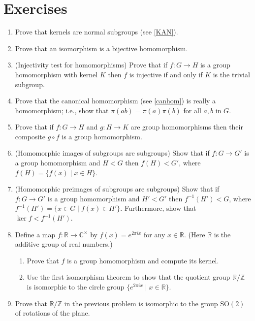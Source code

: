 \documentclass[11pt]{article}
\newenvironment{problems}
{
 \begin{enumerate}[topsep=1pt,itemsep=0pt,parsep=2pt,leftmargin=0.6cm,%
 label={\arabic*.}, ref=\arabic*] \small
}
{
 \end{enumerate}
}
\theoremstyle{definition}
\newcommand{\R}{\mathbb{R}} %
\newcommand{\C}{\mathbb{C}} %
\newcommand{\Z}{\mathbb{Z}} %
\newcommand{\SO}{\mathrm{SO}}
\begin{document}
\section*{Exercises}
\begin{problems}

\item Prove that kernels are normal subgroups (see \ref{KAN}).

\item Prove that an isomorphism is a bijective homomorphism. 

\item{} (Injectivity test for homomorphisms)
  Prove that if $f: G \to H$ is a group homomorphism with kernel $K$
  then $f$ is injective if and only if $K$ is the trivial subgroup.

\item Prove that the canonical homomorphism (see \ref{canhom}) is
  really a homomorphism; i.e., show that $\pi(ab) = \pi(a)\pi(b)$ for
  all $a,b$ in $G$.

\item Prove that if $f: G \to H$ and $g: H \to K$ are group
  homomorphisms then their composite $g \circ f$ is a group
  homomorphism.

\item (Homomorphic images of subgroups are subgroups) Show that if $f:
  G \to G'$ is a group homomorphism and $H < G$ then $f(H) < G'$,
  where $f(H) = \{f(x) \mid x \in H\}$.

\item (Homomorphic preimages of subgroups are subgroups) Show that if
  $f: G \to G'$ is a group homomorphism and $H' < G'$ then $f^{-1}(H')
  < G$, where $f^{-1}(H') = \{x \in G \mid f(x) \in H'
  \}$. Furthermore, show that $\ker f < f^{-1}(H')$.


\item Define a map $f \colon \R \to \C^\times$ by $f(x) = e^{2\pi i
  x}$ for any $x \in \R$. (Here $\R$ is the additive group of real
  numbers.)
  \begin{enumerate}
  \item Prove that $f$ is a group homomorphism and compute its kernel.
  \item Use the first isomorphism theorem to show that the quotient
    group $\R/\Z$ is isomorphic to the circle group $\{e^{2\pi i x}
    \mid x \in \R  \}$.
  \end{enumerate}
  
\item Prove that $\R/\Z$ in the previous problem is isomorphic to the
  group $\SO(2)$ of rotations of the plane.


\end{problems}
\end{document}
